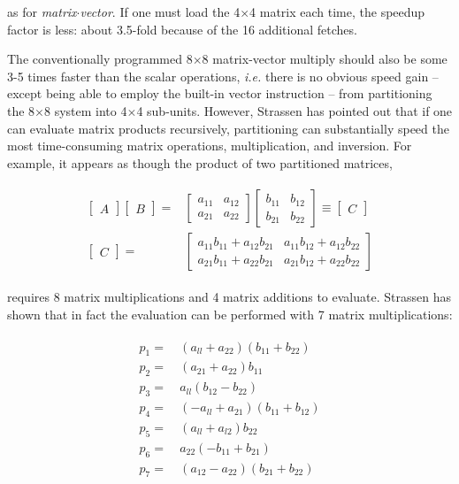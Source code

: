 as for \textit{matrix$\cdot$vector}. If one must load the 4$\times$4 matrix each time, the speedup factor is less: about 3.5-fold because of the 16 additional fetches.

The conventionally programmed 8$\times$8 matrix-vector multiply should also be some 3-5 times faster than the scalar operations, \textit{i.e.} there is no obvious speed gain --except being able to employ the built-in vector instruction -- from partitioning the 8$\times$8 system into 4$\times$4 sub-units. However, Strassen has pointed out that if one can evaluate matrix products recursively, partitioning can substantially speed the most time-consuming matrix operations, multiplication, and inversion. For example, it appears as though the product of two partitioned matrices,

\begin{align}
\begin{split}
    \begin{bmatrix}A\end{bmatrix}
    \begin{bmatrix}B\end{bmatrix} =& 
    \begin{bmatrix}
      a_{11} & a_{12} \\
      a_{21} & a_{22}
    \end{bmatrix}
    \begin{bmatrix}
      b_{11} & b_{12} \\
      b_{21} & b_{22}
    \end{bmatrix}
    \equiv
    \begin{bmatrix}C\end{bmatrix} \\
    \begin{bmatrix}C\end{bmatrix} =&
    \begin{bmatrix}
      a_{11}b_{11}+a_{12}b_{21} & a_{11}b_{12}+a_{12}b_{22} \\
      a_{21}b_{11}+a_{22}b_{21} & a_{21}b_{12}+a_{22}b_{22}
    \end{bmatrix}
\end{split}
\end{align}

requires 8 matrix multiplications and 4 matrix additions to evaluate. Strassen has shown that in fact the evaluation can be performed with 7 matrix multiplications:

\begin{align}
\begin{split}
    p_{1} =&\ (a_{ll} + a_{22}) (b_{11} + b_{22})  \\
    p_{2} =&\ (a_{21} + a_{22}) b_{11}             \\
    p_{3} =&\  a_{ll} (b_{12} - b_{22})            \\
    p_{4} =&\ (-a_{ll} + a_{21}) (b_{11} + b_{12}) \\
    p_{5} =&\ (a_{ll} + a_{l2}) b_{22}             \\
    p_{6} =&\  a_{22} (-b_{11} + b_{21})           \\
    p_{7} =&\ (a_{12} - a_{22}) (b_{21} + b_{22})  
\end{split}
\end{align}


